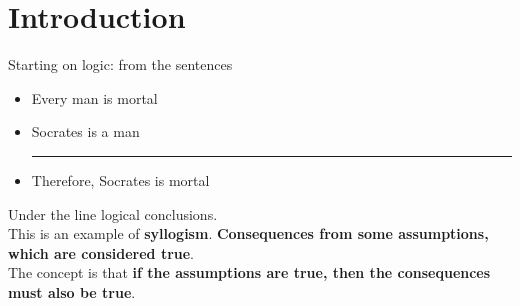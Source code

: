 \documentclass[11pt]{article}
\begin{document}
	\initcurrdate
	\maketitle 									%
	\newcommand{\nn}{\hfill \\}
	\newcommand{\bline}{\noindent\rule[0.5ex]{0.5\linewidth}{0.5pt}}
	\newcommand{\fl}{\mathcal{F}_\mathcal{L}}
	\newcommand{\FL}{\mathcal{F}_\mathcal{L}}
	\newcommand{\ta}{v: \mathcal{L} \rightarrow \{0,1\}}
	\newcommand{\finsat}{\subseteq_\omega}
	\newcommand{\FLe}{\sfrac{\mathcal{F}_\mathcal{L}}{\equiv}}
	\newcommand{\flne}{\sfrac{\mathcal{F}_\mathcal{L}^{(n)}}{\equiv}}
	\newcommand{\fln}{\mathcal{F}_\mathcal{L}^{(n)}}
	\newcommand{\hfln}{\hat{\mathcal{F}}_\mathcal{L}^{(n)}}
	\newcommand{\fle}{\sfrac{\mathcal{F}_\mathcal{L}}{\equiv}}
	\newcommand{\nand}{\text{ nand }}
	\newcommand{\pr}{\preceq_p}
	\newcommand{\np}{\mathcal{NP}}
	\newcommand{\pnp}{\mathcal{P} = \mathcal{NP}}
	
	\tableofcontents
	
	\newpage
	
	\section*{Introduction}
	Starting on logic: from the sentences
	\begin{itemize}
		\item 	Every man is mortal 
		\item Socrates is a man
		\\ \bline
		\item Therefore, Socrates is mortal 
	\end{itemize}
	Under the line logical conclusions.\\
	
	This is an example of \textbf{syllogism}. \textbf{Consequences from some assumptions, which are considered true}.\\
	The concept is that \textbf{if the assumptions are true, then the consequences must also be true}.\\
	
\end{document}
